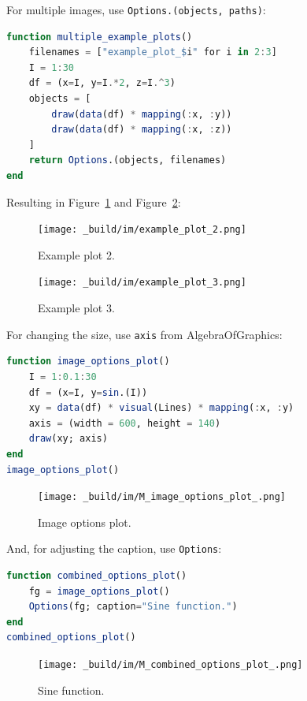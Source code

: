 \documentclass[
  notoc %
]{tufte-book}
\newcommand{\passthrough}[1]{#1}
\begin{document}
For multiple images, use
\passthrough{\lstinline!Options.(objects, paths)!}:

\begin{lstlisting}[language=Julia]
function multiple_example_plots()
    filenames = ["example_plot_$i" for i in 2:3]
    I = 1:30
    df = (x=I, y=I.*2, z=I.^3)
    objects = [
        draw(data(df) * mapping(:x, :y))
        draw(data(df) * mapping(:x, :z))
    ]
    return Options.(objects, filenames)
end
\end{lstlisting}

Resulting in Figure~\ref{fig:example_plot_2} and
Figure~\ref{fig:example_plot_3}:

\begin{figure}
\hypertarget{fig:example_plot_2}{%
\centering
\texttt{[image: \_build/im/example\_plot\_2.png]}
\caption{Example plot 2.}\label{fig:example_plot_2}
}
\end{figure}

\begin{figure}
\hypertarget{fig:example_plot_3}{%
\centering
\texttt{[image: \_build/im/example\_plot\_3.png]}
\caption{Example plot 3.}\label{fig:example_plot_3}
}
\end{figure}

For changing the size, use \passthrough{\lstinline!axis!} from
AlgebraOfGraphics:

\begin{lstlisting}[language=Julia]
function image_options_plot()
    I = 1:0.1:30
    df = (x=I, y=sin.(I))
    xy = data(df) * visual(Lines) * mapping(:x, :y)
    axis = (width = 600, height = 140)
    draw(xy; axis)
end
image_options_plot()
\end{lstlisting}

\begin{figure}
\hypertarget{fig:image_options_plot}{%
\centering
\texttt{[image: \_build/im/M\_image\_options\_plot\_.png]}
\caption{Image options plot.}\label{fig:image_options_plot}
}
\end{figure}

And, for adjusting the caption, use \passthrough{\lstinline!Options!}:

\begin{lstlisting}[language=Julia]
function combined_options_plot()
    fg = image_options_plot()
    Options(fg; caption="Sine function.")
end
combined_options_plot()
\end{lstlisting}

\begin{figure}
\centering
\texttt{[image: \_build/im/M\_combined\_options\_plot\_.png]}
\caption{Sine function.}
\end{figure}
\end{document}
